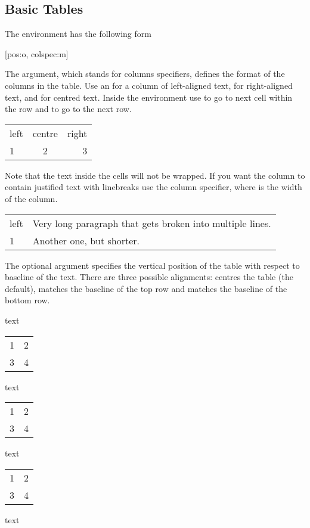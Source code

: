 \subsection{Basic Tables}

The environment  has the following form
\begin{lscommand}
  [pos:o, colspec:m]
\end{lscommand} %
The  argument, which stands for columns specifiers, defines the
format of the columns in the table. Use an  for a column of left-aligned text,
 for right-aligned text, and  for centred text. Inside the
environment use \ai{\&} to go to next cell within the row and
\csi{\bs} to go to the next row.
\begin{example}
\begin{tabular}{lcr}
  left & centre & right \\
  1    & 2      & 3     \\
\end{tabular}
\end{example}
Note that the text inside the cells will not be wrapped. If you want the column
to contain justified text with linebreaks use the 
column specifier, where  is the width of the column.
\begin{example}
\begin{tabular}{lp{3cm}}
  left & Very long paragraph
         that gets broken into
         multiple lines. \\
  1    & Another one,
         but shorter. \\
\end{tabular}
\end{example}

The optional  argument specifies the vertical position of the table
with respect to baseline of the text. There are three possible alignments:
 centres the table (the default),  matches the baseline of
the top row and  matches the baseline of the bottom row.
\begin{example}[examplewidth=0.85\linewidth, vertical_mode]
text
\begin{tabular}{ll} 1 & 2 \\ 3 & 4 \\ \end{tabular}
text
\begin{tabular}[t]{ll} 1 & 2 \\ 3 & 4 \\ \end{tabular}
text
\begin{tabular}[b]{ll} 1 & 2 \\ 3 & 4 \\ \end{tabular}
text
\end{example}


